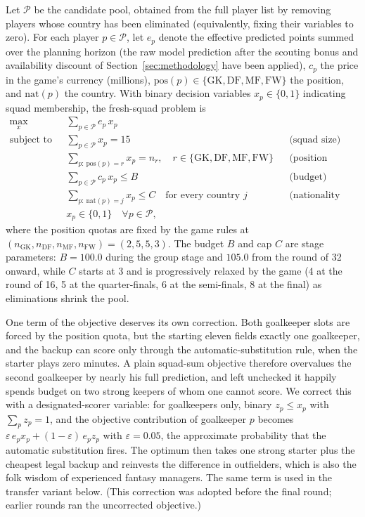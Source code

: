 Let $\mathcal{P}$ be the candidate pool, obtained from the full
player list by removing players whose country has been eliminated
(equivalently, fixing their variables to zero). For each player
$p \in \mathcal{P}$, let $e_p$ denote the effective predicted points
summed over the planning horizon (the raw model prediction after the
scouting bonus and availability discount of
Section~\ref{sec:methodology} have been applied), $c_p$ the price in
the game's currency (millions), $\mathrm{pos}(p) \in \{\mathrm{GK},
\mathrm{DF}, \mathrm{MF}, \mathrm{FW}\}$ the position, and
$\mathrm{nat}(p)$ the country. With binary decision variables
$x_p \in \{0,1\}$ indicating squad membership, the fresh-squad
problem is
\begin{align}
\max_{x} \quad & \sum_{p \in \mathcal{P}} e_p \, x_p
  \label{eq:squad-obj}\\
\text{subject to} \quad
& \sum_{p \in \mathcal{P}} x_p = 15
  && \text{(squad size)} \label{eq:squad-size}\\
& \sum_{p :\, \mathrm{pos}(p) = r} x_p = n_r,
  \quad r \in \{\mathrm{GK}, \mathrm{DF}, \mathrm{MF}, \mathrm{FW}\}
  && \text{(position quotas)} \label{eq:squad-pos}\\
& \sum_{p \in \mathcal{P}} c_p \, x_p \le B
  && \text{(budget)} \label{eq:squad-budget}\\
& \sum_{p :\, \mathrm{nat}(p) = j} x_p \le C
  \quad \text{for every country } j
  && \text{(nationality cap)} \label{eq:squad-country}\\
& x_p \in \{0, 1\}
  \quad \forall p \in \mathcal{P}, \nonumber
\end{align}
where the position quotas are fixed by the game rules at
$(n_{\mathrm{GK}}, n_{\mathrm{DF}}, n_{\mathrm{MF}},
n_{\mathrm{FW}}) = (2, 5, 5, 3)$. The budget $B$ and cap $C$ are
stage parameters: $B = 100.0$ during the group stage and $105.0$ from
the round of 32 onward, while $C$ starts at 3 and is progressively
relaxed by the game (4 at the round of 16, 5 at the quarter-finals,
6 at the semi-finals, 8 at the final) as eliminations shrink the
pool.

One term of the objective deserves its own correction. Both
goalkeeper slots are forced by the position quota, but the starting
eleven fields exactly one goalkeeper, and the backup can score only
through the automatic-substitution rule, when the starter plays zero
minutes. A plain squad-sum objective therefore overvalues the second
goalkeeper by nearly his full prediction, and left unchecked it
happily spends budget on two strong keepers of whom one cannot score.
We correct this with a designated-scorer variable: for goalkeepers
only, binary $z_p \le x_p$ with $\sum_p z_p = 1$, and the objective
contribution of goalkeeper $p$ becomes $\varepsilon\, e_p x_p +
(1-\varepsilon)\, e_p z_p$ with $\varepsilon = 0.05$, the
approximate probability that the automatic substitution fires. The
optimum then takes one strong starter plus the cheapest legal
backup and reinvests the difference in outfielders, which is also
the folk wisdom of experienced fantasy managers. The same term is
used in the transfer variant below. (This correction was adopted
before the final round; earlier rounds ran the uncorrected
objective.)

